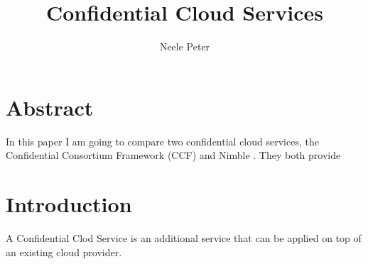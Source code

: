 \documentclass[acmtog]{acmart}
\title{Confidential Cloud Services}
\author{Neele Peter}
\begin{document}
	
	
\maketitle

\tableofcontents
\section{Abstract}	
	In this paper I am going to compare two confidential cloud services, the Confidential Consortium Framework (CCF) \cite{Howard} and Nimble \cite{Nimble}. They both provide 
\newpage

\section{Introduction}
	A Confidential Clod Service is an additional service that can be applied on top of an existing cloud provider. 


\newpage


	
\end{document}
